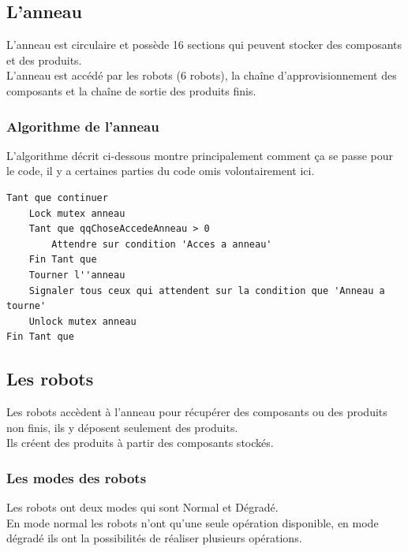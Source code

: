 \documentclass{report}
\begin{document}
\subsection{L'anneau}
L'anneau est circulaire et possède 16 sections qui peuvent stocker des composants et des produits.\\
L'anneau est accédé par les robots (6 robots), la chaîne d'approvisionnement des composants et la chaîne de sortie des produits finis.
\subsubsection{Algorithme de l'anneau}
L'algorithme décrit ci-dessous montre principalement comment ça se passe pour le code, il y a certaines parties du code omis volontairement ici.
\begin{lstlisting}[caption=Algorithme de l'anneau simplifié]
Tant que continuer
	Lock mutex anneau
	Tant que qqChoseAccedeAnneau > 0
		Attendre sur condition 'Acces a anneau'
	Fin Tant que
	Tourner l''anneau
	Signaler tous ceux qui attendent sur la condition que 'Anneau a tourne'
	Unlock mutex anneau
Fin Tant que
\end{lstlisting}

\subsection{Les robots}
Les robots accèdent à l'anneau pour récupérer des composants ou des produits non finis, ils y déposent seulement des produits.\\
Ils créent des produits à partir des composants stockés.
\subsubsection{Les modes des robots}
Les robots ont deux modes qui sont Normal et Dégradé.\\
En mode normal les robots n'ont qu'une seule opération disponible, en mode dégradé ils ont la possibilités de réaliser plusieurs opérations.
\end{document}
